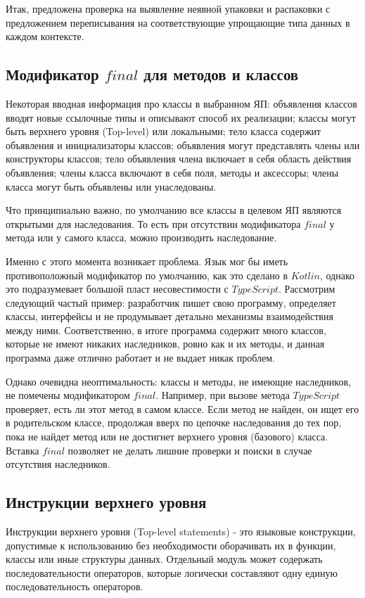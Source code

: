 \documentclass{mipt-thesis-bs}
\begin{document}
Итак, предложена проверка на выявление неявной упаковки и распаковки с предложением
переписывания на соответствующие упрощающие типа данных в каждом контексте.


\subsection{Модификатор $final$ для методов и классов}

Некоторая вводная информация про классы в выбранном ЯП: объявления классов 
вводят новые ссылочные типы и описывают способ их реализации;
классы могут быть верхнего уровня (Top-level) или локальными;
тело класса содержит объявления и инициализаторы классов;
объявления могут представлять члены или конструкторы классов;
тело объявления члена включает в себя область действия объявления;
члены класса включают в себя поля, методы и аксессоры; члены класса могут 
быть объявлены или унаследованы.

Что принципиально важно, по умолчанию все классы в целевом ЯП являются открытыми
для наследования. То есть при отсутствии модификатора $final$ у метода или 
у самого класса, можно производить наследование.

Именно с этого момента возникает проблема. Язык мог бы иметь противоположный
модификатор по умолчанию, как это сделано в $Kotlin$, однако это подразумевает большой пласт несовестимости
с $TypeScript$. Рассмотрим следующий частый пример: разработчик пишет свою программу, 
определяет классы, интерфейсы и не продумывает детально механизмы взаимодействия между ними.
Соответственно, в итоге программа содержит много классов, которые не имеют никаких 
наследников, ровно как и их методы, и данная программа даже отлично работает и не выдает
никак проблем.

Однако очевидна неоптимальность: классы  и методы, не имеющие наследников,
не помечены модификатором $final$. Например, при вызове метода $TypeScript$ проверяет,
есть ли этот метод
в самом классе. Если метод не найден, он ищет его в родительском классе,
продолжая вверх по цепочке наследования до тех пор, пока не найдет метод
или не достигнет верхнего уровня (базового) класса. Вставка $final$ позволяет
не делать лишние проверки и поиски в случае отсутствия наследников.


\subsection{Инструкции верхнего уровня}

Инструкции верхнего уровня (Top-level statements) - это языковые конструкции, допустимые
к использованию без необходимости оборачивать их в функции, классы или иные структуры
данных. Отдельный модуль может содержать последовательности операторов,
которые логически составляют одну единую последовательность операторов.
\end{document}
